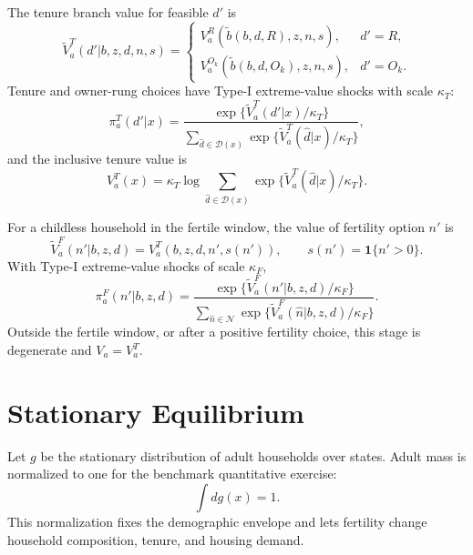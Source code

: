 \documentclass[11pt]{article}
\newcommand{\1}{\mathbf 1}
\newcommand{\Dset}{\mathcal D}
\newcommand{\Nset}{\mathcal N}
\begin{document}
The tenure branch value for feasible $d'$ is
\begin{equation}
\widetilde V_a^T(d'|b,z,d,n,s)
=
\begin{cases}
V_a^R(\tilde b(b,d,R),z,n,s), & d'=R,\\
V_a^{O_k}(\tilde b(b,d,O_k),z,n,s), & d'=O_k.
\end{cases}
\label{eq:quant_tenure_branch}
\end{equation}
Tenure and owner-rung choices have Type-I extreme-value shocks with scale
$\kappa_T$:
\begin{equation}
\pi_a^T(d'|x)
=
\frac{\exp\{\widetilde V_a^T(d'|x)/\kappa_T\}}
{\sum_{\hat d\in\Dset(x)}
\exp\{\widetilde V_a^T(\hat d|x)/\kappa_T\}},
\label{eq:quant_tenure_probs}
\end{equation}
and the inclusive tenure value is
\begin{equation}
V_a^T(x)
=
\kappa_T\log
\sum_{\hat d\in\Dset(x)}
\exp\{\widetilde V_a^T(\hat d|x)/\kappa_T\}.
\label{eq:quant_tenure_iv}
\end{equation}

For a childless household in the fertile window, the value of fertility option
$n'$ is
\begin{equation}
\widetilde V_a^F(n'|b,z,d)
=
V_a^T(b,z,d,n',s(n')),
\qquad
s(n')=\1\{n'>0\}.
\label{eq:quant_fert_branch}
\end{equation}
With Type-I extreme-value shocks of scale $\kappa_F$,
\begin{equation}
\pi_a^F(n'|b,z,d)
=
\frac{\exp\{\widetilde V_a^F(n'|b,z,d)/\kappa_F\}}
{\sum_{\hat n\in\Nset}
\exp\{\widetilde V_a^F(\hat n|b,z,d)/\kappa_F\}}.
\label{eq:quant_fert_probs}
\end{equation}
Outside the fertile window, or after a positive fertility choice, this stage is
degenerate and $V_a=V_a^T$.

\section{Stationary Equilibrium}

Let $g$ be the stationary distribution of adult households over states. Adult
mass is normalized to one for the benchmark quantitative exercise:
\begin{equation}
    \int dg(x)=1.
\label{eq:quant_mass_norm}
\end{equation}
This normalization fixes the demographic envelope and lets fertility change
household composition, tenure, and housing demand.
\end{document}
